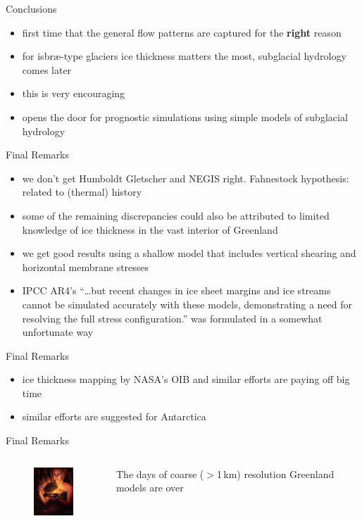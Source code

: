 \documentclass[hide notes,intlimits]{beamer}
\begin{document}
\begin{frame}{Conclusions}
  \begin{itemize}
    \item first time that the general flow patterns are captured for the {\bf right} reason
    \item for isbr{\ae}-type glaciers ice thickness matters the most, subglacial hydrology comes later
    \item this is very encouraging
    \item opens the door for prognostic simulations using simple models of subglacial hydrology
  \end{itemize}
\end{frame}


\begin{frame}{Final Remarks}
  \begin{itemize}
    \item we don't get Humboldt Gletscher and NEGIS right. \alert{Fahnestock hypothesis:} related to (thermal) history
    \item some of the remaining discrepancies could also be attributed to limited knowledge of ice thickness in the vast interior of Greenland
    \item we get good results using a shallow model that includes vertical shearing and horizontal membrane stresses
    \item IPCC AR4's \alert{``\ldots but recent changes in ice sheet margins and ice streams cannot be simulated accurately with these models, demonstrating a need for resolving the full stress configuration.''} was formulated in a somewhat unfortunate way
  \end{itemize}
\end{frame}

\begin{frame}{Final Remarks}
  \begin{itemize}
    \item ice thickness mapping by NASA's OIB and similar efforts are paying off big time
    \item similar efforts are suggested for Antarctica
  \end{itemize}
\end{frame}


\begin{frame}{Final Remarks}
\begin{columns}
  \column[c]{3cm}
  \begin{figure}
    \includegraphics[width=1.75cm]{pandoras-box}
  \end{figure}
  \column[c]{8cm}
  The days of coarse ($>$1\,km) resolution Greenland models are over
\end{columns}
\end{frame}
\end{document}
